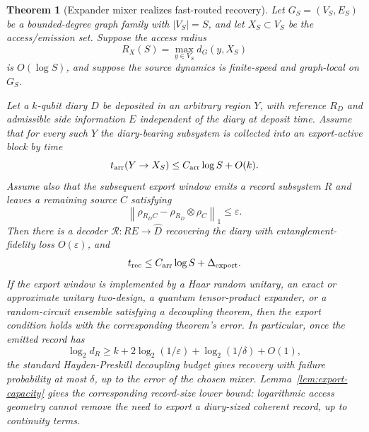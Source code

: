 \documentclass[11pt]{article}
\newtheorem{theorem}{Theorem}
\newcommand{\cR}{\mathcal R}
\begin{document}
\begin{theorem}[Expander mixer realizes fast-routed recovery]
\label{thm:expander-mixer}
Let $G_S=(V_S,E_S)$ be a bounded-degree graph family with
$|V_S|=S$, and let $X_S\subset V_S$ be the access/emission set.  Suppose
the access radius
\begin{equation}
  R_X(S)=\max_{y\in V_S} d_G(y,X_S)
\end{equation}
is $O(\log S)$, and suppose the source dynamics is finite-speed and
graph-local on $G_S$.

Let a $k$-qubit diary $D$ be deposited in an arbitrary region $Y$, with
reference $R_D$ and admissible side information $E$ independent of the
diary at deposit time.  Assume that for every such $Y$ the diary-bearing
subsystem is collected into an export-active block by time
\begin{equation}
  t_{\rm arr}(Y\to X_S)
  \le
  C_{\rm arr}\log S+O(k).
\end{equation}
Assume also that the subsequent export window emits a record subsystem
$R$ and leaves a remaining source $C$ satisfying
\begin{equation}
  \left\|
  \rho_{R_D C}
  -
  \rho_{R_D}\otimes\rho_C
  \right\|_1
  \le
  \varepsilon .
\end{equation}
Then there is a decoder $\cR:RE\to\widehat D$ recovering the diary with
entanglement-fidelity loss $O(\varepsilon)$, and
\begin{equation}
  t_{\rm rec}
  \le
  C_{\rm arr}\log S+\Delta_{\rm export}.
\end{equation}
If the export window is implemented by a Haar random unitary, an exact
or approximate unitary two-design, a quantum tensor-product expander, or
a random-circuit ensemble satisfying a decoupling theorem, then the
export condition holds with the corresponding theorem's error.  In
particular, once the emitted record has
\begin{equation}
  \log_2 d_R
  \ge
  k+2\log_2(1/\varepsilon)+\log_2(1/\delta)+O(1),
\end{equation}
the standard Hayden-Preskill decoupling budget gives recovery with
failure probability at most $\delta$, up to the error of the chosen
mixer.  Lemma~\ref{lem:export-capacity} gives the corresponding
record-size lower bound: logarithmic access geometry cannot remove the
need to export a diary-sized coherent record, up to continuity terms.
\end{theorem}
\end{document}
